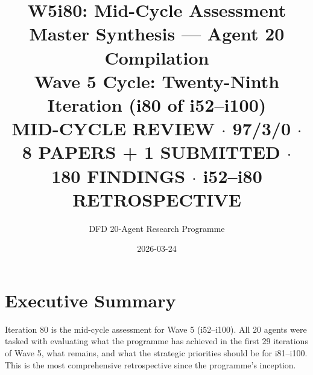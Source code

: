 \documentclass[11pt,a4paper]{article}
\title{\Huge W5i80: Mid-Cycle Assessment\\[12pt]
\Large Master Synthesis --- Agent 20 Compilation\\[6pt]
\large Wave 5 Cycle: Twenty-Ninth Iteration (i80 of i52--i100)\\[6pt]
\normalsize \textbf{MID-CYCLE REVIEW} $\cdot$ 97/3/0 $\cdot$ 8 PAPERS + 1 SUBMITTED $\cdot$ 180 FINDINGS $\cdot$ i52--i80 RETROSPECTIVE}
\author{DFD 20-Agent Research Programme}
\date{2026-03-24}
\begin{document}
\maketitle

\section{Executive Summary}

Iteration 80 is the mid-cycle assessment for Wave 5 (i52--i100). All 20 agents were tasked with evaluating what the programme has achieved in the first 29 iterations of Wave 5, what remains, and what the strategic priorities should be for i81--i100. This is the most comprehensive retrospective since the programme's inception.
\end{document}
